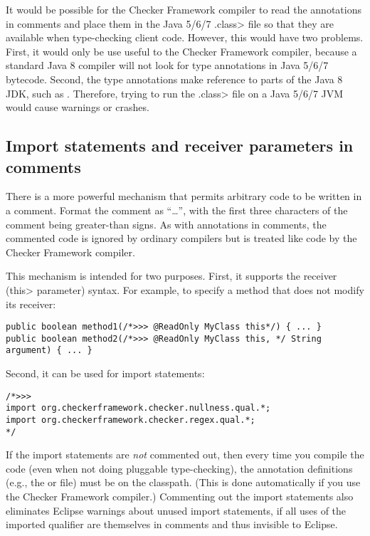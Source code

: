 It would be possible for the Checker Framework compiler to read the
annotations in comments and place them in the Java 5/6/7 \<.class> file so
that they are available when type-checking client code.  However, this
would have two problems.  First, it would only be use useful to the Checker
Framework compiler, because a standard Java 8 compiler will not look for
type annotations in Java 5/6/7 bytecode.  Second, the type annotations
make reference to parts of the Java 8 JDK, such as
.
Therefore, trying to run the \<.class> file on a Java 5/6/7 JVM
would cause warnings or crashes.


\subsection{Import statements and receiver parameters in comments\label{receivers-and-imports-in-comments}}

There is a more powerful mechanism that permits arbitrary code to be
written in a comment.  Format the comment as ``\code{/*>>>}\ldots\code{*/}'',
with the first three characters of the comment being greater-than signs. As
with annotations in comments, the commented code is ignored by ordinary
compilers but is treated like code by the
Checker Framework compiler.

This mechanism is intended for two purposes.
First, it supports the receiver (\<this> parameter) syntax.  For example,
to specify a method that does not modify its receiver:

\begin{Verbatim}
public boolean method1(/*>>> @ReadOnly MyClass this*/) { ... }
public boolean method2(/*>>> @ReadOnly MyClass this, */ String argument) { ... }
\end{Verbatim}

Second, it can be used for import statements:

\begin{Verbatim}
/*>>>
import org.checkerframework.checker.nullness.qual.*;
import org.checkerframework.checker.regex.qual.*;
*/
\end{Verbatim}

\noindent
If the import statements are \emph{not} commented out, then every time you
compile the code (even when not doing pluggable type-checking),
the annotation definitions (e.g., the 
or  file) must be on the classpath.
(This is done automatically if you use the Checker Framework compiler.)
Commenting out the import statements also eliminates Eclipse
warnings about unused import statements, if all uses of the imported
qualifier are themselves in comments and thus invisible to Eclipse.

